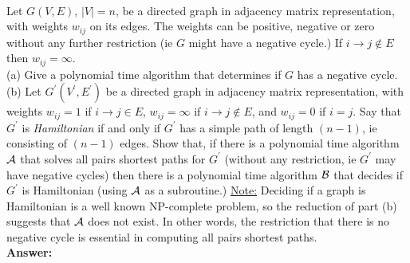 \documentclass[a4paper,11pt]{article}
\begin{document}
\bigskip
{}\\
Let $G(V,E)$, $|V|=n$, be a directed graph in adjacency matrix representation, with weights $w_{ij}$ on its edges.
The weights can be positive, negative or zero without any further restriction (ie $G$ might have a negative cycle.) 
If  $i\rightarrow j \not\in E$ then $w_{ij}=\infty$.\\
(a) Give a polynomial time algorithm that determines if $G$ has a negative cycle.\\ 
(b) Let $G^\prime (V^\prime , E^\prime )$ be a directed graph in adjacency matrix representation, 
with weights $w_{ij}=1$ if $i\rightarrow j \in E$, $w_{ij}=\infty$  if $i\rightarrow j \not\in E$,
and $w_{ij}=0$ if $i=j$. 
Say that $G^\prime$ is {\em Hamiltonian} if and only if $G^\prime$ has a simple path of length $(n-1)$, 
ie consisting of $(n-1)$ edges. 
Show that, if there is a polynomial time algorithm  ${\cal A}$ that solves all pairs shortest paths for $G^\prime$ 
(without any restriction, ie $G^\prime$ may have negative cycles)
then there is a polynomial time algorithm ${\cal B}$  that decides if $G^\prime$ is Hamiltonian
(using ${\cal A}$  as a subroutine.)
\underline{Note:} Deciding if a graph is Hamiltonian is a well known NP-complete problem, 
so the reduction of part (b) suggests that ${\cal A}$ does not exist. In other words, the restriction that there is no negative cycle
is essential in computing all pairs shortest paths. \\
{\bf Answer:}\\
\end{document}
